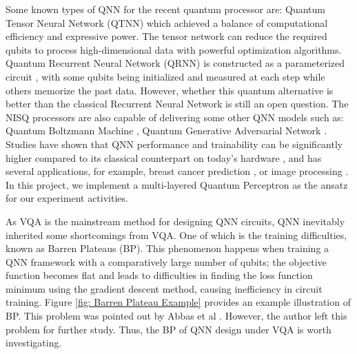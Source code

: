 Some known types of QNN for the recent quantum processor are: 
Quantum Tensor Neural Network (QTNN) \cite{hugginsQuantumMachineLearning2019} which achieved a balance of computational efficiency and expressive power. 
The tensor network can reduce the required qubits to process high-dimensional data with powerful optimization algorithms.
Quantum Recurrent Neural Network (QRNN) is constructed as a parameterized circuit \cite{takakiLearningTemporalData2021}, with some qubits being initialized and measured at each step while others memorize the past data.
However, whether this quantum alternative is better than the classical Recurrent Neural Network is still an open question.
The NISQ processors are also capable of delivering some other QNN models such as: 
Quantum Boltzmann Machine \cite{shinguBoltzmannMachineLearning2021}\cite{zoufalVariationalQuantumBoltzmann2021}, 
Quantum Generative Adversarial Network \cite{dallaire-demersQuantumGenerativeAdversarial2018}\cite{lloydQuantumGenerativeAdversarial2018}. Studies have shown that QNN performance and trainability can be significantly higher compared to its classical counterpart on today's hardware \cite{abbasPowerQuantumNeural2021, colesSeekingQuantumAdvantage2021}, and has several applications, for example, breast cancer prediction \cite{liModelAlgorithmQuantuminspired2014}, or image processing \cite{matsuiQubitNeuralNetwork2009}. 
In this project, we implement a multi-layered Quantum Perceptron \cite{kristensenArtificialSpikingQuantum2021} as the ansatz for our experiment activities.

As VQA is the mainstream method for designing QNN circuits, QNN inevitably inherited some shortcomings from VQA.
One of which is the training difficulties, known as Barren Plateaus (BP).
This phenomenon happens when training a QNN framework with a comparatively large number of qubits; the objective function becomes flat and leads to difficulties in finding the loss function minimum using the gradient descent method, \cite{mccleanBarrenPlateausQuantum2018, zhaoAnalyzingBarrenPlateau2021} causing inefficiency in circuit training. 
Figure \ref{fig: Barren Plateau Example} provides an example illustration of BP.
This problem was pointed out  by Abbas et al \cite{abbasPowerQuantumNeural2021}. 
However, the author left this problem for further study. 
Thus, the BP of QNN design under VQA is worth investigating.

